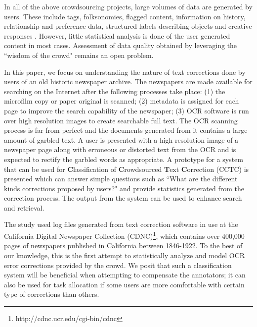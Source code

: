 \documentclass{sig-alternate}
\begin{document}
In all of the above crowdsourcing projects, large volumes of data are generated by users. These include tags, folksonomies, flagged content, information on history, relationship and preference data, structured labels describing objects and creative responses \cite{Ridge_11}. However, little statistical analysis is done of the user generated content in most cases. Assessment of data quality obtained by leveraging the ``wisdom of the crowd" remains an open problem. 


In this paper, we focus on understanding the nature of text corrections done by users of an old historic newspaper archive. The newspapers are made available for searching on the Internet after the following processes take place: (1) the microfilm copy or paper original is scanned; %
(2) metadata is assigned for each page to improve the search capability of the newspaper; (3) OCR software is run over high resolution images to create searchable full text.
The OCR scanning process is far from perfect and the documents generated from it contains a large amount of garbled text. A user is presented with a high resolution image of a newspaper page along with erroneous or distorted text from the OCR and is expected to rectify the garbled words as appropriate. A prototype for a system that can be used for \textbf{C}lassification of \textbf{C}rowdsourced \textbf{T}ext \textbf{C}orrection (CCTC) is presented which can answer simple questions such as ``What are the different kinds corrections proposed by users?" and provide statistics generated from the correction process. The output from the system can be used to enhance search and retrieval.

The study used log files generated from text correction software in use at the California Digital Newspaper Collection (CDNC)\footnote{http://cdnc.ucr.edu/cgi-bin/cdnc}, which contains over 400,000 pages of newspapers published in California between 1846-1922. 
To the best of our knowledge, this is the first attempt to statistically analyze and model OCR error corrections provided by the crowd. We posit that such a classification system will be beneficial when attempting to compensate the annotators; it can also be used for task allocation if some users are more comfortable with certain type of corrections than others.
\end{document}
